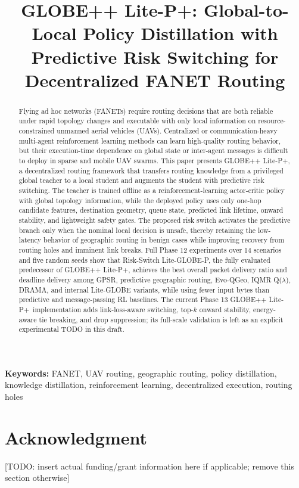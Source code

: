 \documentclass[journal]{IEEEtran}
\title{GLOBE++ Lite-P+: Global-to-Local Policy Distillation with Predictive Risk Switching for Decentralized FANET Routing}
\author{
\IEEEauthorblockN{Kyeongeun Kim\IEEEauthorrefmark{1}, [TODO: Corresponding / Co-Author Name]\IEEEauthorrefmark{1}}
\IEEEauthorblockA{\IEEEauthorrefmark{1}[TODO: Department name], Ajou University, ACE Lab, Suwon, Republic of Korea\\
Email: [TODO: corresponding author email]}
}
\newcommand{\method}{GLOBE++ Lite-P+}
\newcommand{\phaseTwelve}{Risk-Switch Lite-GLOBE-P}
\begin{document}
\maketitle

\begin{abstract}
Flying ad hoc networks (FANETs) require routing decisions that are both reliable under rapid topology changes and executable with only local information on resource-constrained unmanned aerial vehicles (UAVs). Centralized or communication-heavy multi-agent reinforcement learning methods can learn high-quality routing behavior, but their execution-time dependence on global state or inter-agent messages is difficult to deploy in sparse and mobile UAV swarms. This paper presents \method, a decentralized routing framework that transfers routing knowledge from a privileged global teacher to a local student and augments the student with predictive risk switching. The teacher is trained offline as a reinforcement-learning actor-critic policy with global topology information, while the deployed policy uses only one-hop candidate features, destination geometry, queue state, predicted link lifetime, onward stability, and lightweight safety gates. The proposed risk switch activates the predictive branch only when the nominal local decision is unsafe, thereby retaining the low-latency behavior of geographic routing in benign cases while improving recovery from routing holes and imminent link breaks. Full Phase 12 experiments over 14 scenarios and five random seeds show that \phaseTwelve, the fully evaluated predecessor of \method, achieves the best overall packet delivery ratio and deadline delivery among GPSR, predictive geographic routing, Evo-QGeo, IQMR Q($\lambda$), DRAMA, and internal Lite-GLOBE variants, while using fewer input bytes than predictive and message-passing RL baselines. The current Phase 13 \method\ implementation adds link-loss-aware switching, top-$k$ onward stability, energy-aware tie breaking, and drop suppression; its full-scale validation is left as an explicit experimental TODO in this draft.
\end{abstract}

\textbf{Keywords:} FANET, UAV routing, geographic routing, policy distillation, knowledge distillation, reinforcement learning, decentralized execution, routing holes












\section*{Acknowledgment}
[TODO: insert actual funding/grant information here if applicable; remove this section otherwise]



\end{document}
